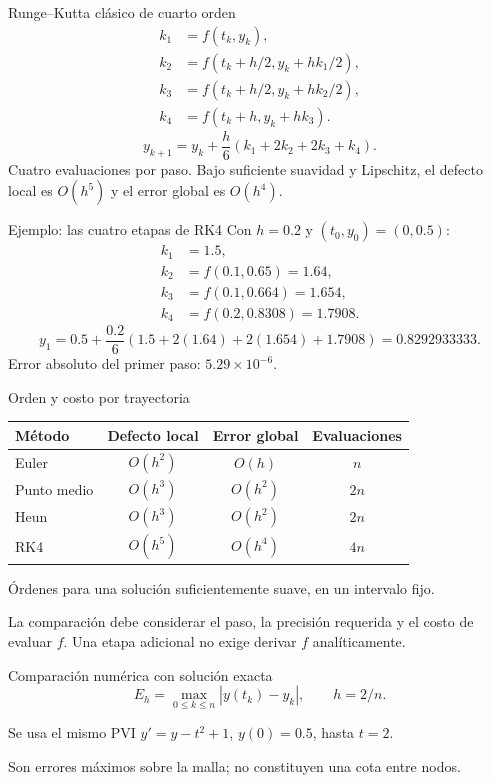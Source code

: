 \documentclass[aspectratio=169,12pt]{beamer}
\newcommand{\datos}{datos/edo}
\begin{document}
\begin{frame}{Runge--Kutta clásico de cuarto orden}
\begin{align*}
k_1&=f(t_k,y_k),\\
k_2&=f(t_k+h/2,y_k+hk_1/2),\\
k_3&=f(t_k+h/2,y_k+hk_2/2),\\
k_4&=f(t_k+h,y_k+hk_3).
\end{align*}
\[\boxed{y_{k+1}=y_k+\frac h6(k_1+2k_2+2k_3+k_4).}\]
Cuatro evaluaciones por paso. Bajo suficiente suavidad y Lipschitz,
el defecto local es $O(h^5)$ y el error global es $O(h^4)$.
\end{frame}

\begin{frame}{Ejemplo: las cuatro etapas de RK4}
Con $h=0.2$ y $(t_0,y_0)=(0,0.5)$:
\begin{align*}
k_1&=1.5,\\
k_2&=f(0.1,0.65)=1.64,\\
k_3&=f(0.1,0.664)=1.654,\\
k_4&=f(0.2,0.8308)=1.7908.
\end{align*}
\[y_1=0.5+\frac{0.2}{6}(1.5+2(1.64)+2(1.654)+1.7908)
=\boxed{0.8292933333}.\]
Error absoluto del primer paso: $5.29\times10^{-6}$.
\end{frame}

\begin{frame}{Orden y costo por trayectoria}
\begin{center}
\begin{tabular}{lccc}\toprule
Método&Defecto local&Error global&Evaluaciones\\\midrule
Euler&$O(h^2)$&$O(h)$&$n$\\[1mm]
Punto medio&$O(h^3)$&$O(h^2)$&$2n$\\[1mm]
Heun&$O(h^3)$&$O(h^2)$&$2n$\\[1mm]
RK4&$O(h^5)$&$O(h^4)$&$4n$\\\bottomrule
\end{tabular}
\end{center}
Órdenes para una solución suficientemente suave, en un intervalo fijo.
\medskip

La comparación debe considerar el paso, la precisión requerida y el costo de evaluar $f$.
Una etapa adicional no exige derivar $f$ analíticamente.
\end{frame}

\begin{frame}{Comparación numérica con solución exacta}
\[E_h=\max_{0\leq k\leq n}|y(t_k)-y_k|,\qquad h=2/n.\]
\begin{center}\small\end{center}
Se usa el mismo PVI $y'=y-t^2+1$, $y(0)=0.5$, hasta $t=2$.
\medskip

Son errores máximos sobre la malla; no constituyen una cota entre nodos.
\end{frame}
\end{document}
